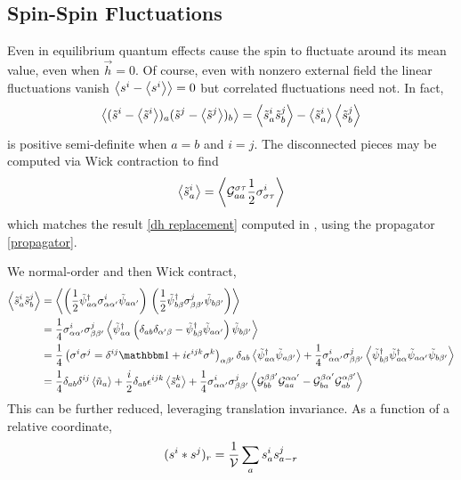 \subsection{Spin-Spin Fluctuations}\label{sec:spin fluctuations}

Even in equilibrium quantum effects cause the spin to fluctuate around its mean value, even when $\vec{h}=0$.
Of course, even with nonzero external field the linear fluctuations vanish $\left\langle s^i - \left\langle s^i \right\rangle \right\rangle = 0$ but correlated fluctuations need not.
In fact,
\begin{align}
    \left\langle  (\tilde{s}^i-\left\langle \tilde{s}^i \right\rangle)_a (\tilde{s}^j-\left\langle \tilde{s}^j \right\rangle)_b  \right\rangle
    =
    \left\langle  \tilde{s}^i_a \tilde{s}^j_b  \right\rangle - \left\langle \tilde{s}^i_a \right\rangle \left\langle \tilde{s}^j_b \right\rangle
\end{align}
is positive semi-definite when $a=b$ and $i=j$.
The disconnected pieces may be computed via Wick contraction to find
\begin{align}
	\left\langle  \tilde{s}^i_a  \right\rangle = \left\langle  \mathcal{G}^{\sigma\tau}_{aa} \frac{1}{2} \sigma^{i}_{\sigma\tau} \right\rangle
\end{align}
which matches the result \eqref{dh replacement} computed in , using the propagator \eqref{propagator}.

We normal-order and then Wick contract,
\begin{align}
	\expectation{ \tilde{s}^i_a \tilde{s}^j_b }
	&=
	\expectation{
		\left(\half \tilde{\psi}\adjoint_{a\alpha} \sigma^i_{\alpha\alpha'} \tilde{\psi}_{a\alpha'}\right)
		\,
		\left(\half \tilde{\psi}\adjoint_{b\beta}  \sigma^j_{\beta \beta' } \tilde{\psi}_{b\beta' }\right)
	}
	\nonumber\\
	&=
	\oneover{4} \sigma^i_{\alpha\alpha'} \sigma^j_{\beta \beta' }
	\expectation{
		\tilde{\psi}\adjoint_{a\alpha}
		\left(\delta_{ab}\delta_{\alpha'\beta} - \tilde{\psi}\adjoint_{b\beta} \tilde{\psi}_{a\alpha'} \right)
		\tilde{\psi}_{b\beta' }
	}
	\nonumber\\
	&=
	\oneover{4} \left(\sigma^i\sigma^j = \delta^{ij}\one + i \epsilon^{ijk}\sigma^k\right)_{\alpha\beta'} \delta_{ab}
	\expectation{
		\tilde{\psi}\adjoint_{a\alpha}
		\tilde{\psi}_{a\beta' }
	}
	+ \oneover{4} \sigma^i_{\alpha\alpha'} \sigma^j_{\beta \beta' }
	\expectation{
		\tilde{\psi}\adjoint_{b\beta}
		\tilde{\psi}\adjoint_{a\alpha}
		\tilde{\psi}_{a\alpha'}
		\tilde{\psi}_{b\beta' }
	}
	\nonumber\\
	&=
	\oneover{4}   \delta_{ab} \delta^{ij} \expectation{ \tilde{n}_a }
	+ \frac{i}{2} \delta_{ab} \epsilon^{ijk} \expectation{ \tilde{s}^k_a }
	+ \oneover{4} \sigma^i_{\alpha\alpha'} \sigma^j_{\beta \beta' }
	\expectation{
		\G_{bb}^{\beta\beta'} \G_{aa}^{\alpha\alpha'}
	-	\G_{ba}^{\beta\alpha'} \G_{ab}^{\alpha\beta'}
	}
\end{align}
This can be further reduced, leveraging translation invariance.  As a function of a relative coordinate,
\begin{align}
	(s^i*s^j)_r = \frac{1}{\mathcal{V}} \sum_a s^i_a s^j_{a-r}
\end{align}

